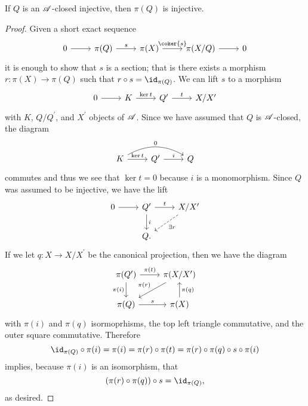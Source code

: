 \documentclass[10pt]{amsart}
\begin{document}
\begin{lem}\label{lem6}
  If $Q$ is an $\mathscr{A}$-closed injective, then $\pi(Q)$ is injective.

  \begin{proof}
    Given a short exact sequence
    $$\begin{tikzcd}
      0 \arrow{r} & \pi(Q) \arrow{r}{s} & \pi(X) \arrow{r}{\coker{s}} & \pi(X/Q) \arrow{r} & 0
    \end{tikzcd}$$
    it is enough to show that $s$ is a section; that is there exists a morphism $r \colon \pi(X) \rightarrow \pi(Q)$ such that $r \circ s = \id_{\pi(Q)}$.
    We can lift $s$ to a morphism 
    $$\begin{tikzcd}
      0 \arrow{r} & K \arrow{r}{\ker{t}} & Q^\prime \arrow{r}{t} & X/X^\prime
    \end{tikzcd}$$
    with $K$, $Q/Q^\prime$, and $X^\prime$ objects of $\mathscr{A}$.
    Since we have assumed that $Q$ is $\mathscr{A}$-closed, the diagram
    $$\begin{tikzcd}
      K \arrow{r}{\ker t}\arrow[bend left]{rr}{0} & Q^\prime \arrow{r}{i} & Q
    \end{tikzcd}$$
    commutes and thus we see that $\ker{t} = 0$ because $i$ is a monomorphism.
    Since $Q$ was assumed to be injective, we have the lift
    $$\begin{tikzcd}
      0 \arrow{r} & Q^\prime \arrow{r}{t} \arrow{d}{i} & X/X^\prime\arrow[dashed]{ld}{\exists r}\\
        & Q.
    \end{tikzcd}$$
    If we let $q \colon X \rightarrow X/X^\prime$ be the canonical projection, then we have the diagram
    $$\begin{tikzcd}
      \pi(Q^\prime)\arrow[swap]{d}{\pi(i)}\arrow{r}{\pi(t)} & \pi(X/X^\prime)\arrow[swap]{ld}{\pi(r)}\\
      \pi(Q)\arrow{r}{s} & \pi(X)\arrow[swap]{u}{\pi(q)}
    \end{tikzcd}$$
    with $\pi(i)$ and $\pi(q)$ isormoprhisms, the top left triangle commutative, and the outer square commutative.
    Therefore
    $$\id_{\pi(Q)} \circ \pi(i) = \pi(i) = \pi(r) \circ \pi(t) = \pi(r) \circ \pi(q) \circ s \circ \pi(i)$$
    implies, because $\pi(i)$ is an isomorphism, that
    $$\left(\pi(r) \circ \pi(q)\right) \circ s = \id_{\pi(Q)},$$
    as desired.
  \end{proof}
\end{lem}
\end{document}
